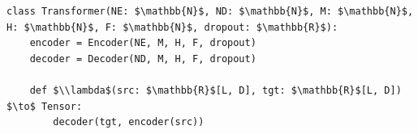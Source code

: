 \documentclass[border=10pt]{standalone}
\begin{document}
\begin{lstlisting}
class Transformer(NE: $\mathbb{N}$, ND: $\mathbb{N}$, M: $\mathbb{N}$, H: $\mathbb{N}$, F: $\mathbb{N}$, dropout: $\mathbb{R}$):
    encoder = Encoder(NE, M, H, F, dropout)
    decoder = Decoder(ND, M, H, F, dropout)

    def $\\lambda$(src: $\mathbb{R}$[L, D], tgt: $\mathbb{R}$[L, D]) $\to$ Tensor:
        decoder(tgt, encoder(src))
\end{lstlisting}
\end{document}
